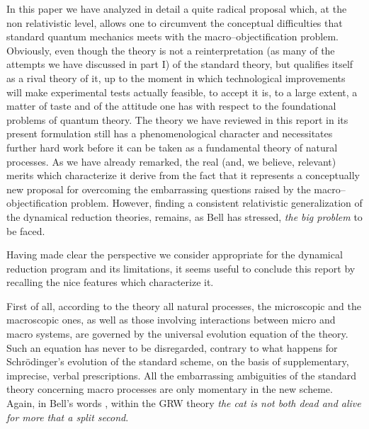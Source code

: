 \documentclass[10pt,a4paper]{article}
\begin{document}
In this paper we have analyzed in detail a quite radical proposal
which, at the non relativistic level, allows one to circumvent the
conceptual difficulties that standard quantum mechanics meets with
the macro--objectification problem. Obviously, even though the
theory is not a reinterpretation (as many of the attempts we have
discussed in part I) of the standard theory, but qualifies itself
as a rival theory of it, up to the moment in which technological
improvements will make experimental tests actually feasible, to
accept it is, to a large extent, a matter of taste and of the
attitude one has with respect to the foundational problems of
quantum theory. The theory we have reviewed in this report in its
present formulation still has  a phenomenological character and
necessitates further hard work before it can be taken as a
fundamental theory of natural processes. As we have already
remarked,  the real (and, we believe, relevant) merits which
characterize it  derive from the fact that it represents a
conceptually new proposal for overcoming the embarrassing
questions raised by the macro--objectification problem. However,
finding a consistent relativistic generalization of the dynamical
reduction theories, remains, as Bell has stressed, {\it the big
problem} to be faced.

Having made clear the perspective we consider appropriate for  the
dynamical reduction program and its limitations,  it seems useful to
conclude this report by  recalling the nice features which
characterize it.

First of all, according to the theory all natural processes,  the
microscopic and the macroscopic ones, as well as those involving
interactions between micro and macro systems, are governed by the
universal evolution equation of the theory. Such an equation has
never to be disregarded, contrary to what happens for
Schr\"odinger's evolution  of the standard scheme, on the basis of
supplementary, imprecise, verbal prescriptions. All the
embarrassing ambiguities of the standard theory concerning macro
processes are only momentary in the new scheme. Again, in Bell's
words \cite{bells},  within the GRW theory {\it the cat is not
both dead and alive for more that a split second}.
\end{document}
